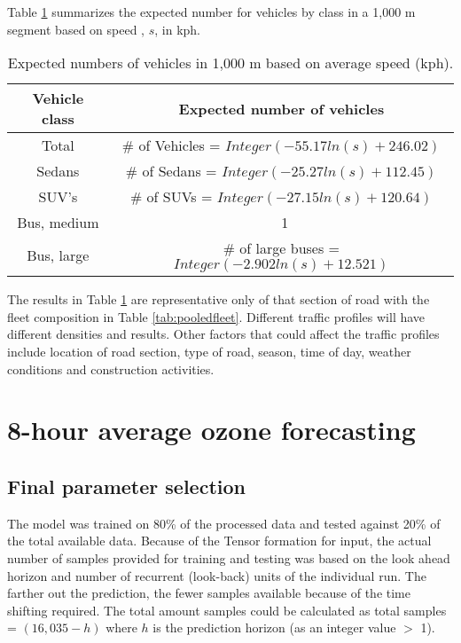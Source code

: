 Table \ref{tb4:expectedvehicles} summarizes the expected number for vehicles by class in a 1,000 m segment based on speed , $s$, in kph.
%
\begin{table}[!htb]
\centering
\caption{ Expected numbers of vehicles in 1,000 m based on average speed (kph).}
\label{tb4:expectedvehicles}
\begin{tabular}{@{}cc@{}}
\toprule
\textbf{Vehicle class} & \textbf{Expected number of vehicles } \\ \midrule
Total & \# of Vehicles = $Integer(-55.17ln(s) + 246.02)$ \\
Sedans & \# of Sedans = $Integer (-25.27ln(s) + 112.45)$ \\
SUV's & \# of SUVs = $Integer (-27.15ln(s) + 120.64)$ \\
Bus, medium & \ 1 \\
Bus, large & \# of large buses = $Integer (-2.902ln(s) + 12.521)$ \\ \bottomrule
\end{tabular}
\end{table}
%
The results in Table \ref{tb4:expectedvehicles} are representative only of that section of road with the fleet composition in Table \ref{tab:pooledfleet}.  Different traffic profiles will have different densities and results.  Other factors that could affect the traffic profiles include location of road section, type of road, season, time of day, weather conditions and construction activities. 

\clearpage
\section{8-hour average ozone forecasting}

\subsection{Final parameter selection}
The model was trained on 80\% of the processed data and tested against 20\% of the total available data. Because of the Tensor formation for input, the actual number of samples provided for training and testing was based on the look ahead horizon and number of recurrent (look-back) units of the individual run. The farther out the prediction, the fewer samples available because of the time shifting required. The total amount samples could be calculated as total samples = $(16,035 - h)$ where $h$ is the prediction horizon (as an integer value $>$ 1). 

